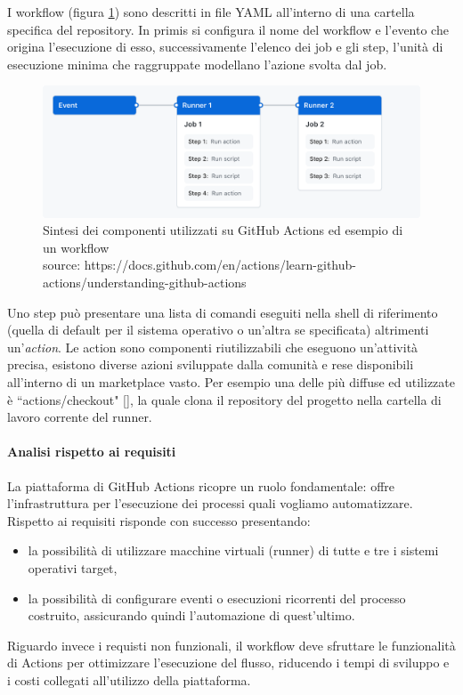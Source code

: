 I workflow (figura \ref{fig:github-actions-example}) sono descritti in file YAML all'interno di una cartella specifica del repository. In primis si configura il nome del workflow e l'evento che origina l'esecuzione di esso, successivamente l'elenco dei job e gli step, l'unità di esecuzione minima che raggruppate modellano l'azione svolta dal job.

\begin{figure}[htb]
	\centering
	\includegraphics[width=.9\linewidth]{figures/overview-actions-simple.png}
	\caption{Sintesi dei componenti utilizzati su GitHub Actions ed esempio di un workflow \\ source: https://docs.github.com/en/actions/learn-github-actions/understanding-github-actions}
	\label{fig:github-actions-example}
\end{figure}

Uno step può presentare una lista di comandi eseguiti nella shell di riferimento (quella di default per il sistema operativo o un'altra se specificata) altrimenti un'\textit{action}. Le action sono componenti riutilizzabili che eseguono un'attività precisa, esistono diverse azioni sviluppate dalla comunità e rese disponibili all'interno di un marketplace vasto. Per esempio una delle più diffuse ed utilizzate è ``actions/checkout" [\cite{github-actions-diffusion}], la quale clona il repository del progetto nella cartella di lavoro corrente del runner.

\paragraph{Analisi rispetto ai requisiti}

La piattaforma di GitHub Actions ricopre un ruolo fondamentale: offre l'infrastruttura per l'e\-se\-cu\-zio\-ne dei processi quali vogliamo automatizzare. Rispetto ai requisiti risponde con successo presentando:
\begin{itemize}
	\item la possibilità di utilizzare macchine virtuali (runner) di tutte e tre i sistemi operativi target,
	\item la possibilità di configurare eventi o esecuzioni ricorrenti del processo costruito, assicurando quindi l'automazione di quest'ultimo.
\end{itemize}
Riguardo invece i requisti non funzionali, il workflow deve sfruttare le funzionalità di Actions per ottimizzare l'esecuzione del flusso, riducendo i tempi di sviluppo e i costi collegati all'utilizzo della piattaforma.

